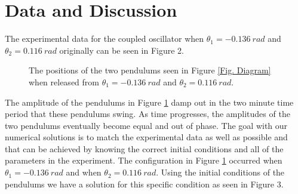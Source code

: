 \documentclass[twocolumn]{article}
\begin{document}
\section*{Data and Discussion}
The experimental data for the coupled oscillator when $\theta_{1}=-0.136 \ rad$ and $\theta_{2}=0.116 \ rad$ originally can be seen in Figure 2.
\begin{figure}[h]
    \centering
    \caption{\small{The positions of the two pendulums seen in Figure \ref{Fig. Diagram} when released from $\theta_1=-0.136 \ rad$ and $\theta_2=0.116 \ rad$.}}
    \label{Fig. Situation 1 Data}
\end{figure}
\par \noindent
The amplitude of the pendulums in Figure \ref{Fig. Situation 1 Data} damp out in the two minute time period that these pendulums swing. As time progresses, the amplitudes of the two pendulums eventually become equal and out of phase. The goal with our numerical solutions is to match the experimental data as well as possible and that can be achieved by knowing the correct initial conditions and all of the parameters in the experiment. The configuration in Figure \ref{Fig. Situation 1 Data} occurred when $\theta_{1}=-0.136\ rad$ and when $\theta_{2}=0.116\ rad$. Using the initial conditions of the pendulums we have a solution for this specific condition as seen in Figure 3.
\end{document}
